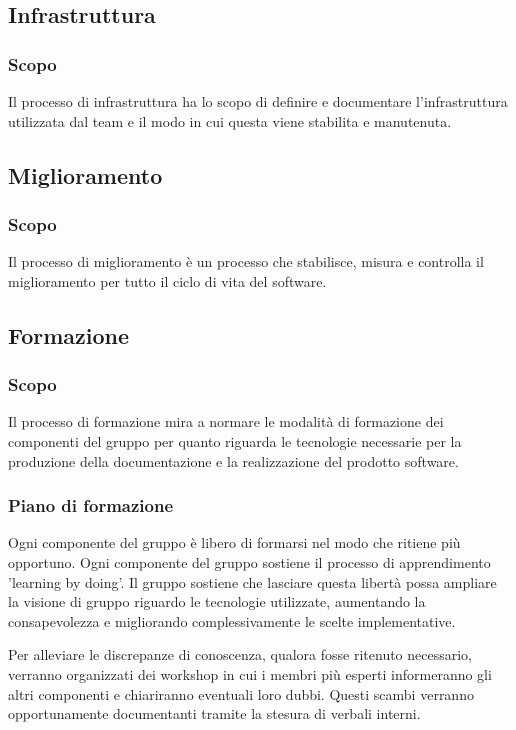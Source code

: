\documentclass[10pt, a4paper]{article}
\begin{document}
\subsection{Infrastruttura}
\subsubsection{Scopo}
Il processo di infrastruttura ha lo scopo di definire e documentare l'infrastruttura utilizzata dal team e il modo in cui questa viene stabilita e manutenuta.


\subsection{Miglioramento}
\subsubsection{Scopo}
Il processo di miglioramento è un processo che stabilisce, misura e controlla il miglioramento per tutto il ciclo di vita del software. 



\subsection{Formazione}
\subsubsection{Scopo}
Il processo di formazione mira a normare le modalità di formazione dei componenti del gruppo per quanto riguarda le tecnologie necessarie per la produzione della documentazione e la realizzazione del prodotto software.

\subsubsection{Piano di formazione}
Ogni componente del gruppo è libero di formarsi nel modo che ritiene più opportuno.
Ogni componente del gruppo sostiene il processo di apprendimento 'learning by doing'.
Il gruppo sostiene che lasciare questa libertà possa ampliare la visione di gruppo riguardo le tecnologie utilizzate, aumentando la consapevolezza e migliorando complessivamente le scelte implementative.

Per alleviare le discrepanze di conoscenza, qualora fosse ritenuto necessario, verranno organizzati dei workshop in cui i membri più esperti informeranno gli altri componenti e chiariranno eventuali loro dubbi.
Questi scambi verranno opportunamente documentanti tramite la stesura di verbali interni.
\end{document}
